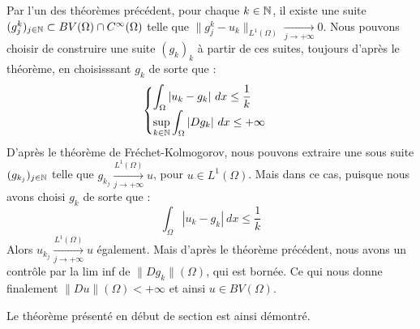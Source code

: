 Par l'un des théorèmes précédent, pour chaque $k \in \mathbb{N}$, il existe une suite $(g^k_j)_{j \in \mathbb{N}} \subset BV(\Omega) \cap C^{\infty}(\Omega)$ telle que $\|g^k_j - u_k\|_{L^1(\Omega)} \xrightarrow[j \to +\infty]{} 0$.
Nous pouvons choisir de construire une suite $(g_k)_k$ à partir de ces suites, toujours d'après le théorème, en choisisssant $g_k$ de sorte que :
$$\begin{cases}
    \displaystyle \int_{\Omega} |u_k - g_k| \ dx \leq \frac{1}{k} \\
    \displaystyle \underset{k \in \mathbb{N}}{\sup}\int_{\Omega} |Dg_k| \ dx \leq + \infty
\end{cases}$$
D'après le théorème de Fréchet-Kolmogorov, nous pouvons extraire une sous suite $(g_{k_j})_{j \in \mathbb{N}}$ telle que $g_{k_j} \xrightarrow[j \to +\infty]{L^1(\Omega)} u $, pour $u \in L^1(\Omega)$.
Mais dans ce cas, puisque nous avons choisi $g_k$ de sorte que :
$$\int_{\Omega} |u_k - g_k| \ dx \leq \frac{1}{k} $$
Alors $u_{k_j} \xrightarrow[j \to +\infty]{L^1(\Omega)}u$ également.
Mais d'après le théorème précédent, nous avons un contrôle par la lim inf de $\|Dg_k\|(\Omega)$, qui est bornée. Ce qui nous donne finalement $\|Du\|(\Omega) < +\infty$ et ainsi $u \in BV(\Omega)$. 

Le théorème présenté en début de section est ainsi démontré.
